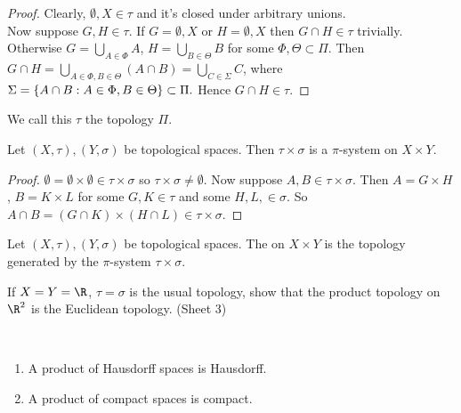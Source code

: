 \begin{proof}
Clearly, $\emptyset, X\in \tau$ and it's closed under arbitrary unions. \\
Now suppose $G,H \in \tau$.
If $G = \emptyset, X$ or $H = \emptyset, X$ then $G \cap H \in \tau$ trivially. \\
Otherwise $G = \bigcup_{A\in \Phi} A$, $H =\bigcup_{B \in \Theta} B$ for some $\Phi, \Theta \subset \Pi$.
Then $G \cap H = \bigcup_{A\in \Phi, B\in \Theta} (A \cap B) = \bigcup_{C \in \Sigma} C$, where $\Sigma = \{A \cap B : A\in \Phi, B\in \Theta\}\subset \Pi.$ Hence $G\cap H\in \tau$.
\end{proof}

\begin{definition}
We call this $\tau$ the topology  $\Pi$.
\end{definition}

\begin{proposition} \label{prp:38}
Let $(X,\tau), (Y,\sigma)$ be topological spaces. Then $\tau\times \sigma$ is a $\pi$-system on $X\times Y$.
\end{proposition}

\begin{proof}
$\emptyset = \emptyset \times \emptyset \in \tau\times \sigma$ so $\tau\times \sigma\neq \emptyset$. Now suppose $A,B\in\tau\times \sigma $. Then $A = G\times H$, $B=K\times L$ for some $G,K\in \tau$ and some $H,L,\in \sigma$. So $A\cap B = (G\cap K)\times (H\cap L) \in \tau\times \sigma$.
\end{proof}

\begin{definition}
Let $(X,\tau), (Y,\sigma)$ be topological spaces. The  on $X\times Y$ is the topology generated by the $\pi$-system $\tau \times \sigma$.
\end{definition}
\begin{exercise*}
If $X=Y=\R$, $\tau=\sigma$ is the usual topology, show that the product topology on $\R^2$ is the Euclidean topology. (Sheet 3)
\end{exercise*}

\begin{theorem} \label{prp:39} ~\vspace*{-1.5\baselineskip}
\begin{enumerate}
    \item A product of Hausdorff spaces is Hausdorff.
    \item A product of compact spaces is compact.
\end{enumerate}
\end{theorem}

